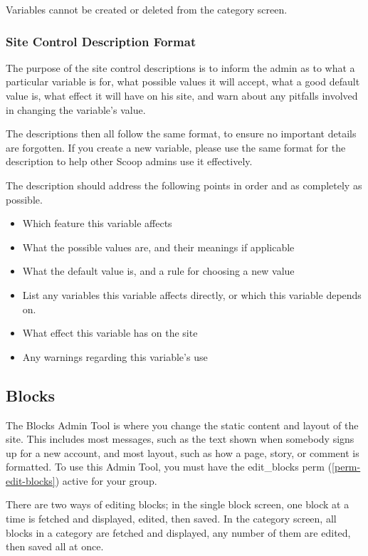 Variables cannot be created or deleted from the category screen.

\subsubsection{Site Control Description Format}
\label{vars-description-format}

The purpose of the site control descriptions is to inform the admin as to what a particular variable is for, what possible values it will accept, what a good default value is, what effect it will have on his site, and warn about any pitfalls involved in changing the variable's value.

The descriptions then all follow the same format, to ensure no important details are forgotten.  If you create a new variable, please use the same format for the description to help other Scoop admins use it effectively.

The description should address the following points in order and as completely as possible.

\begin{itemize}
\item Which feature this variable affects
\item What the possible values are, and their meanings if applicable
\item What the default value is, and a rule for choosing a new value
\item List any variables this variable affects directly, or which this variable depends on.
\item What effect this variable has on the site
\item Any warnings regarding this variable's use
\end{itemize}

\subsection{Blocks}
\label{admin-tools-blocks}

The Blocks Admin Tool is where you change the static content and layout of the site.  This includes most messages, such as the text shown when somebody signs up for a new account, and most layout, such as how a page, story, or comment is formatted.  To use this Admin Tool, you must have the edit\_blocks perm (\ref{perm-edit-blocks}) active for your group.

There are two ways of editing blocks; in the single block screen, one block at a time is fetched and displayed, edited, then saved. In the category screen, all blocks in a category are fetched and displayed, any number of them are edited, then saved all at once.

